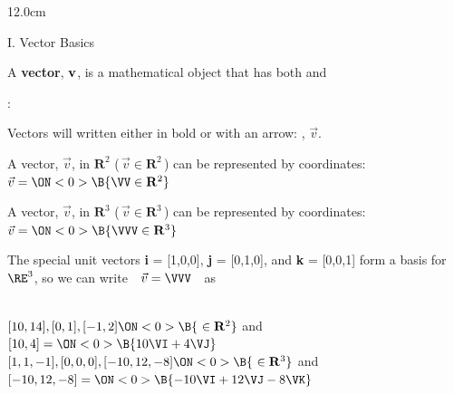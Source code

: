 \begin{frame}
\frametitle{}
\begin{columns}
\begin{column}{12.0cm}

{I. Vector Basics}

\vspace{0.2cm}

\scriptsize

\DEF A {\bf vector}, ${\bf v}$, is a mathematical object that has both  and 

\vspace{0.5cm}

: \\

\vspace{0.2cm}

\OBUL  Vectors will written either in bold or with an arrow: , $\vec{v}$.\\

\vspace{0.2cm}

\OBUL  A vector, $\vec{v}$, in $\mathbf{R}^2$ (\,$\vec{v} \in \mathbf{R}^2$\,) can be represented by  coordinates: \quad $\vec{v} = \ON<0>{\B{\VV \in \mathbf{R}^2}}$\\

\vspace{0.2cm}

\OBUL  A vector, $\vec{v}$, in $\mathbf{R}^3$ (\,$\vec{v} \in \mathbf{R}^3$\,) can be represented by  coordinates: \quad $\vec{v} = \ON<0>{\B{\VVV \in \mathbf{R}^3}}$\\

\vspace{0.2cm}

\OBUL  The special unit vectors {\bf i} = [1,0,0], {\bf j} = [0,1,0], and {\bf k} = [0,0,1] form a basis for $\RE^3$, \NEWLINE so we can write \,\, $\vec{v} = \VVV$ \,\, as \,\, 

\vspace{0.5cm}

\EX \\
\vspace{0.1cm}
\OBUL $[10,14], [0,1], [-1,2] \ON<0>{\B{\,\, \in \mathbf{R}^2}}$ \quad and \quad $[10,4] = \ON<0>{\B{10\VI + 4 \VJ}}$\\
\vspace{0.2cm}
\OBUL $[1,1,-1], [0,0,0], [-10,12,-8] \ON<0>{\B{\,\, \in \mathbf{R}^3}}$ \quad and \quad $[-10,12,-8] = \ON<0>{\B{-10\VI + 12 \VJ - 8\VK}}$\\


\end{column}
\end{columns}
\end{frame}
